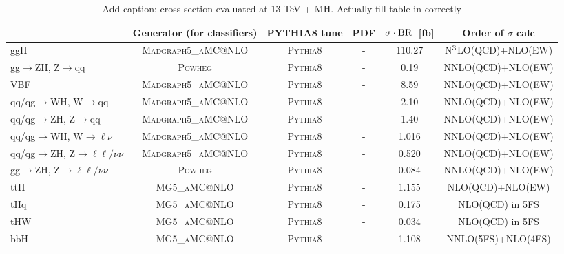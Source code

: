 \begin{table}[htb]
    \caption{Add caption: cross section evaluated at 13 TeV + MH. Actually fill table in correctly}
    \label{tab:signal samples}
    \vspace{.5cm}
    \centering
    \centering
    \scriptsize
    \renewcommand{\arraystretch}{1.8}
    \begin{tabular}{lccccc}
       & Generator (for classifiers) & \textsc{PYTHIA8} tune & PDF & $\sigma\cdot\rm{BR}$~[fb] & Order of $\sigma$ calc \\ \hline
       ggH & \textsc{Madgraph5\_aMC@NLO} & \textsc{Pythia8} & - & 110.27 & N$^{\rm{3}}$LO(QCD)+NLO(EW) \\
       gg$\rightarrow$ZH, Z$\rightarrow$qq & \textsc{Powheg} & \textsc{Pythia8} & - & 0.19 & NNLO(QCD)+NLO(EW) \\
       \hline
       VBF & \textsc{Madgraph5\_aMC@NLO} & \textsc{Pythia8} & - & 8.59 & NNLO(QCD)+NLO(EW) \\
       qq/qg$\rightarrow$WH, W$\rightarrow$qq & \textsc{Madgraph5\_aMC@NLO} & \textsc{Pythia8} & - & 2.10 & NNLO(QCD)+NLO(EW) \\
       qq/qg$\rightarrow$ZH, Z$\rightarrow$qq & \textsc{Madgraph5\_aMC@NLO} & \textsc{Pythia8} & - & 1.40 & NNLO(QCD)+NLO(EW) \\
       \hline
       qq/qg$\rightarrow$WH, W$\rightarrow\ell\nu$ & \textsc{Madgraph5\_aMC@NLO} & \textsc{Pythia8} & - & 1.016 & NNLO(QCD)+NLO(EW) \\
       qq/qg$\rightarrow$ZH, Z$\rightarrow\ell\ell/\nu\nu$ & \textsc{Madgraph5\_aMC@NLO} & \textsc{Pythia8} & - & 0.520 & NNLO(QCD)+NLO(EW) \\
       gg$\rightarrow$ZH, Z$\rightarrow\ell\ell/\nu\nu$ & \textsc{Powheg} & \textsc{Pythia8} & - & 0.084 & NNLO(QCD)+NLO(EW) \\
       \hline
       ttH & \textsc{MG5\_aMC@NLO} & \textsc{Pythia8} & - & 1.155 & NLO(QCD)+NLO(EW) \\
       \hline
       tHq & \textsc{MG5\_aMC@NLO} & \textsc{Pythia8} & - & 0.175 & NLO(QCD) in 5FS \\
       tHW & \textsc{MG5\_aMC@NLO} & \textsc{Pythia8} & - & 0.034 & NLO(QCD) in 5FS \\
       \hline
       bbH & \textsc{MG5\_aMC@NLO} & \textsc{Pythia8} & - & 1.108 & NNLO(5FS)+NLO(4FS) \\

    \end{tabular}
\end{table}

